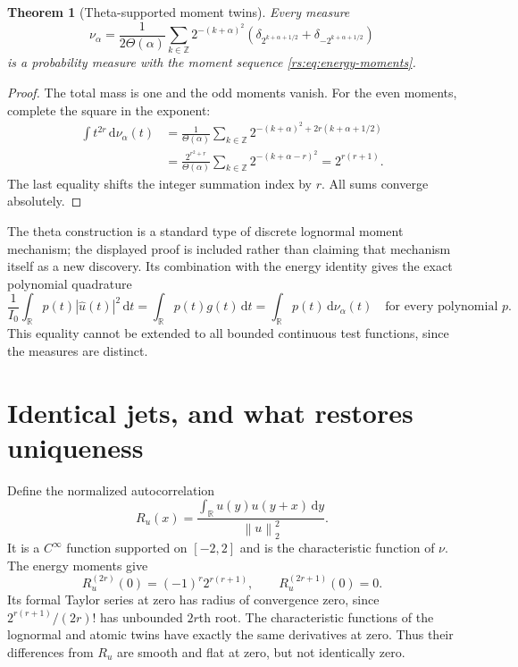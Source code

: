 \documentclass[11pt,a4paper,oneside,openany]{book}
\numberwithin{equation}{chapter}
\newtheorem{theorem}{Theorem}[chapter]
\theoremstyle{definition}
\theoremstyle{remark}
\newcommand{\Z}{\mathbb Z}
\newcommand{\R}{\mathbb R}
\newcommand{\dd}{\,\mathrm d}
\newcommand{\norm}[1]{\left\lVert #1\right\rVert}
\begin{document}
\begin{theorem}[Theta-supported moment twins]\label{rs:thm:theta}
Every measure
\begin{equation}
 \nu_\alpha=\frac1{2\Theta(\alpha)}
 \sum_{k\in\Z}2^{-(k+\alpha)^2}
 \left(\delta_{2^{k+\alpha+1/2}}+
       \delta_{-2^{k+\alpha+1/2}}\right)
 \label{rs:eq:atomic-twin}
\end{equation}
is a probability measure with the moment sequence
\eqref{rs:eq:energy-moments}.
\end{theorem}
\begin{proof}
The total mass is one and the odd moments vanish. For the even
moments, complete the square in the exponent:
\begin{align}
 \int t^{2r}\dd\nu_\alpha(t)
 &=\frac1{\Theta(\alpha)}
     \sum_{k\in\Z}2^{-(k+\alpha)^2+2r(k+\alpha+1/2)}\nonumber\\
 &=\frac{2^{r^2+r}}{\Theta(\alpha)}
     \sum_{k\in\Z}2^{-(k+\alpha-r)^2}
 =2^{r(r+1)}.
\end{align}
The last equality shifts the integer summation index by $r$.
All sums converge absolutely.
\end{proof}

The theta construction is a standard type of discrete lognormal
moment mechanism; the displayed proof is included rather than
claiming that mechanism itself as a new discovery. Its combination
with the energy identity gives the exact polynomial quadrature
\begin{equation}
 \frac1{I_0}\int_{\R}p(t)|\widehat u(t)|^2\dd t
 =\int_{\R}p(t)g(t)\dd t
 =\int_{\R}p(t)\dd\nu_\alpha(t)
 \quad\text{for every polynomial }p.
 \label{rs:eq:polynomial-quadrature}
\end{equation}
This equality cannot be extended to all bounded continuous test
functions, since the measures are distinct.

\section{Identical jets, and what restores uniqueness}

Define the normalized autocorrelation
\begin{equation}
 R_u(x)=\frac{\int_{\R}u(y)u(y+x)\dd y}{\norm{u}_2^2}.
 \label{rs:eq:autocorrelation}
\end{equation}
It is a $C^\infty$ function supported on $[-2,2]$ and is the
characteristic function of $\nu$. The energy moments give
\begin{equation}
 R_u^{(2r)}(0)=(-1)^r2^{r(r+1)},\qquad R_u^{(2r+1)}(0)=0.
 \label{rs:eq:autocorrelation-jet}
\end{equation}
Its formal Taylor series at zero has radius of convergence zero,
since $2^{r(r+1)}/(2r)!$ has unbounded $2r$th root. The
characteristic functions of the lognormal and atomic twins have
exactly the same derivatives at zero. Thus their differences from
$R_u$ are smooth and flat at zero, but not identically zero.
\end{document}
